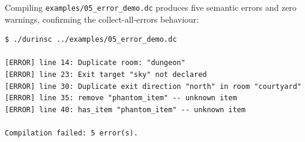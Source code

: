 \documentclass[12pt, a4paper]{article}
\begin{document}
Compiling \texttt{examples/05\_error\_demo.dc} produces five semantic errors and
zero warnings, confirming the collect-all-errors behaviour:

\begin{lstlisting}[style=bash, caption={Semantic error output}, numbers=none]
$ ./durinsc ../examples/05_error_demo.dc

[ERROR] line 14: Duplicate room: "dungeon"
[ERROR] line 23: Exit target "sky" not declared
[ERROR] line 30: Duplicate exit direction "north" in room "courtyard"
[ERROR] line 35: remove "phantom_item" -- unknown item
[ERROR] line 40: has_item "phantom_item" -- unknown item

Compilation failed: 5 error(s).
\end{lstlisting}
\end{document}
